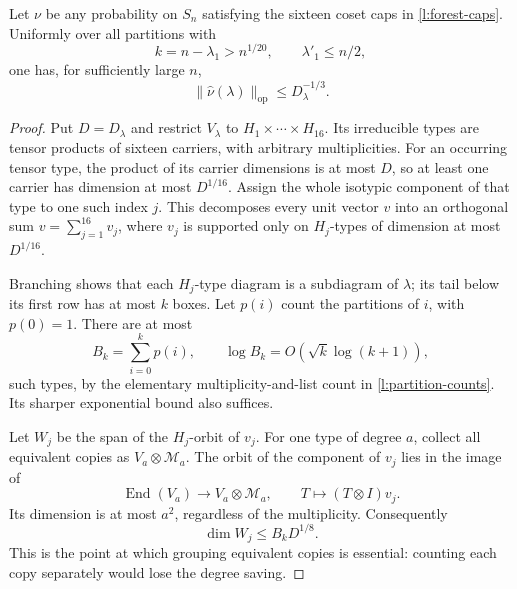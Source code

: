 \begin{proposition}
\label{l:forest-bulk}
Let $\nu$ be any probability on $S_n$ satisfying the sixteen coset
caps in \eqref{l:forest-caps}.  Uniformly over all partitions with
\[
 k=n-\lambda_1>n^{1/20},\qquad \lambda'_1\le n/2,
\]
one has, for sufficiently large $n$,
\begin{equation}
 \|\widehat\nu(\lambda)\|_{\mathrm{op}}
 \le D_\lambda^{-1/3}.
 \label{l:forest-bulk-bound}
\end{equation}
\end{proposition}

\begin{proof}
Put $D=D_\lambda$ and restrict $V_\lambda$ to
$H_1\times\cdots\times H_{16}$.  Its irreducible types are tensor
products of sixteen carriers, with arbitrary multiplicities.
For an occurring tensor type, the product of its carrier dimensions
is at most $D$, so at least one carrier has dimension at most
$D^{1/16}$.  Assign the whole isotypic component of that type to
one such index $j$.  This decomposes every unit vector $v$ into an
orthogonal sum $v=\sum_{j=1}^{16}v_j$, where $v_j$ is supported only
on $H_j$-types of dimension at most $D^{1/16}$.

Branching shows that each $H_j$-type diagram is a subdiagram of
$\lambda$; its tail below its first row has at most $k$ boxes.
Let $p(i)$ count the partitions of $i$, with $p(0)=1$.  There are at most
\[
 B_k=\sum_{i=0}^k p(i),\qquad
 \log B_k=O(\sqrt k\log(k+1)),
\]
such types, by the elementary multiplicity-and-list count in
\eqref{l:partition-counts}.  Its sharper exponential bound also
suffices.

Let $W_j$ be the span of the $H_j$-orbit of $v_j$.
For one type of degree $a$, collect all equivalent copies as
$V_a\otimes\mathcal M_a$.  The orbit of the component of $v_j$
lies in the image of
\[
 \operatorname{End}(V_a)\longrightarrow V_a\otimes\mathcal M_a,
 \qquad T\longmapsto(T\otimes I)v_j.
\]
Its dimension is at most $a^2$, regardless of the multiplicity.
Consequently
\begin{equation}
 \dim W_j\le B_k D^{1/8}.
 \label{l:forest-orbit-span}
\end{equation}
This is the point at which grouping equivalent copies is essential:
counting each copy separately would lose the degree saving.


\end{proof}

